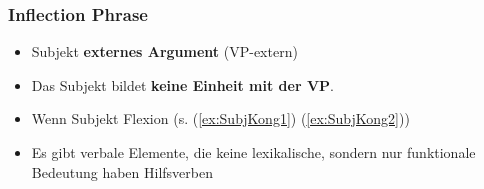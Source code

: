 \begin{frame}
\frametitle{Inflection Phrase}

\begin{itemize}
		\item Subjekt \ras \textbf{externes Argument} (VP-extern)

		\item Das Subjekt bildet \textbf{keine Einheit mit der VP}.	

		\z

\pause

		\item Wenn Subjekt \ras Flexion	(s. (\ref{ex:SubjKong1}) \vs (\ref{ex:SubjKong2}))	

		\label{ex:SubjKong1}
			
		\label{ex:SubjKong2}
		\z
		
		\item Es gibt verbale Elemente, die keine lexikalische, sondern nur funktionale Bedeutung haben \ras Hilfsverben

\end{itemize}

\end{frame}


